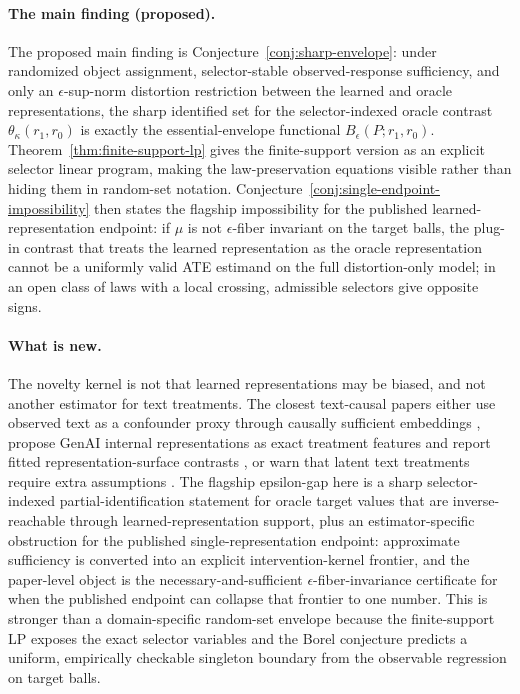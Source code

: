\documentclass[11pt]{article}
\theoremstyle{definition}
\theoremstyle{plain}
\theoremstyle{remark}
\begin{document}
\paragraph{The main finding (proposed).}
The proposed main finding is Conjecture~\ref{conj:sharp-envelope}: under randomized object assignment, selector-stable observed-response sufficiency, and only an \(\epsilon\)-sup-norm distortion restriction between the learned and oracle representations, the sharp identified set for the selector-indexed oracle contrast \(\theta_{\kappa}(r_1,r_0)\) is exactly the essential-envelope functional \(B_\epsilon(P;r_1,r_0)\).  Theorem~\ref{thm:finite-support-lp} gives the finite-support version as an explicit selector linear program, making the law-preservation equations visible rather than hiding them in random-set notation.  Conjecture~\ref{conj:single-endpoint-impossibility} then states the flagship impossibility for the published learned-representation endpoint: if \(\mu\) is not \(\epsilon\)-fiber invariant on the target balls, the plug-in contrast that treats the learned representation as the oracle representation cannot be a uniformly valid ATE estimand on the full distortion-only model; in an open class of laws with a local crossing, admissible selectors give opposite signs.

\paragraph{What is new.}
The novelty kernel is not that learned representations may be biased, and not another estimator for text treatments.  The closest text-causal papers either use observed text as a confounder proxy through causally sufficient embeddings \citep{VeitchSridharBlei2020}, propose GenAI internal representations as exact treatment features and report fitted representation-surface contrasts \citep{ImaiNakamura2024TextTreatments,ImaiNakamura2025GPI}, or warn that latent text treatments require extra assumptions \citep{FongGrimmer2023}.  The flagship epsilon-gap here is a sharp selector-indexed partial-identification statement for oracle target values that are inverse-reachable through learned-representation support, plus an estimator-specific obstruction for the published single-representation endpoint: approximate sufficiency is converted into an explicit intervention-kernel frontier, and the paper-level object is the necessary-and-sufficient \(\epsilon\)-fiber-invariance certificate for when the published endpoint can collapse that frontier to one number.  This is stronger than a domain-specific random-set envelope because the finite-support LP exposes the exact selector variables and the Borel conjecture predicts a uniform, empirically checkable singleton boundary from the observable regression on target balls.
\end{document}
